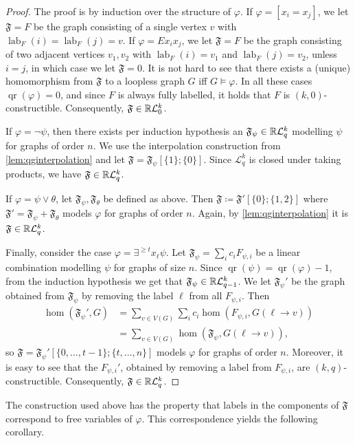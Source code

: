 \documentclass{lmcs}
\theoremstyle{plain}\newtheorem{claim}[thm]{Claim}   %
\newcommand{\RR}{\ensuremath \mathbb{R}}
\newcommand{\cL}{\ensuremath{\mathcal L}}
\DeclareMathOperator{\qr}{qr}
\newcommand{\Lkq}{\ensuremath{\cL_{q}^{k}}}
\newcommand{\LParam}[2]{\ensuremath{\cL_{#2}^{#1}}}
\newcommand{\qg}[1]{\ensuremath{\mathfrak{#1}}}
\newcommand{\qgp}[3]{\ensuremath{\mathfrak{#1}[#3; #2]}}
\newcommand{\elimOrd}[2]{$(#1,#2)$-constructible}
\DeclareMathOperator{\labfkt}{lab}
\renewcommand\phi\varphi
\begin{document}
\begin{proof}
	The proof is by induction over the structure of $\phi$.
	If $\phi = [x_i = x_j]$, we let $\qg{F} = F$ be the graph consisting of a single vertex $v$ with $\labfkt_F(i) = \labfkt_F(j) = v$.
	If $\phi = Ex_ix_j$, we let $\qg{F} = F$ be the graph consisting of two adjacent vertices $v_1, v_2$ with $\labfkt_F(i) = v_1$ and $\labfkt_F(j) = v_2$, unless $i = j$, in which case we let $\qg{F} = 0$.
	It is not hard to see that there exists a (unique) homomorphism from $\qg{F}$ to a loopless graph $G$ iff $G \models \varphi$.
	In all these cases $\qr(\phi) = 0$, and since $F$ is always fully labelled, it holds that $F$ is \elimOrd{k}{0}.
	Consequently, $\qg{F} \in \RR\LParam{k}{0}$.
	
	If $\phi = \neg \psi$, then there exists per induction hypothesis an $\qg{F}_\psi \in \RR\Lkq$ modelling $\psi$ for graphs of order $n$.
	We use the interpolation construction from \autoref{lem:qginterpolation} and let $\qg{F} = \qgp{F_\psi}{\{0\}}{\{1\}}$.
	Since $\Lkq$ is closed under taking products, we have $\qg{F} \in \RR\Lkq$.
	
	If $\phi = \psi \lor \theta$, let $\qg{F_\psi}, \qg{F_\theta}$ be defined as above.
	Then $\qg{F} \coloneqq \qgp{F'}{\{1, 2\}}{\{0\}}$ where $\qg{F'} = \qg{F_\psi} + \qg{F_\theta}$ models $\phi$ for graphs of order $n$.
	Again, by \autoref{lem:qginterpolation} it is $\qg{F} \in \RR\Lkq$.
	
	Finally, consider the case $\phi = \exists^{{\geq} t} x_\ell \psi$.
	Let $\qg{F_\psi} = \sum_{i}c_iF_{\psi, i}$ be a linear combination modelling $\psi$ for graphs of size $n$.
	Since $\qr(\psi) = \qr(\phi) - 1$, from the induction hypothesis we get that $\qg{F_\psi} \in \RR\LParam{k}{q-1}$.
	We let $\qg{F_\psi'}$ be the graph obtained from $\qg{F_\psi}$ by removing the label $\ell$ from all $F_{\psi, i}$.
	Then
	\begin{align*}
		\hom(\qg{F_\psi'}, G) &= \sum_{v \in V(G)}\sum_i c_i\hom(F_{\psi, i}, G(\ell \to v))\\
		&= \sum_{v \in V(G)}\hom(\qg{F_\psi}, G(\ell \to v)),
	\end{align*}
	so $\qg{F} = \qgp{F_\psi'}{\{t, \dots, n\}}{\{0, \dots, t-1\}}$ models $\phi$ for graphs of order $n$.
	Moreover, it is easy to see that the $F_{\psi, i}'$, obtained by removing a label from $F_{\psi, i}$, are \elimOrd{k}{q}.
	Consequently, $\qg{F} \in \RR\Lkq$.
\end{proof}

The construction used above has the property that labels in the components of $\qg{F}$ correspond to free variables of $\phi$.
This correspondence yields the following corollary.
\end{document}
